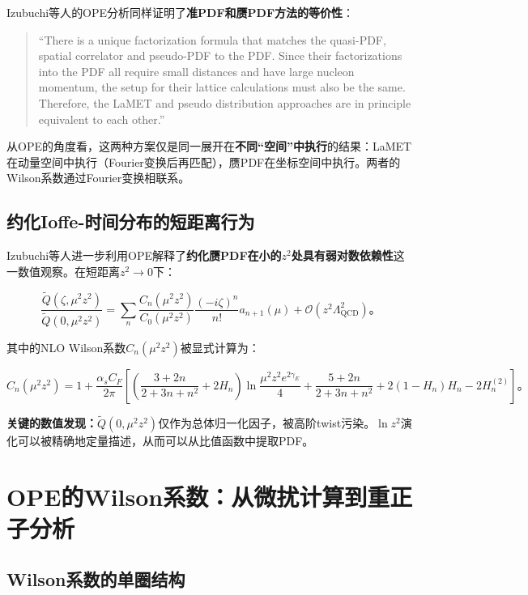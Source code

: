 \documentclass[12pt,a4paper]{ctexart}
\theoremstyle{definition}
\begin{document}
Izubuchi等人\cite{Izubuchi2018}的OPE分析同样证明了\textbf{准PDF和赝PDF方法的等价性}：

\begin{quote}
``There is a unique factorization formula that matches the quasi-PDF, spatial correlator and pseudo-PDF to the PDF. Since their factorizations into the PDF all require small distances and have large nucleon momentum, the setup for their lattice calculations must also be the same. Therefore, the LaMET and pseudo distribution approaches are in principle equivalent to each other.''
\end{quote}

从OPE的角度看，这两种方案仅是同一展开在\textbf{不同``空间''中执行}的结果：LaMET在动量空间中执行（Fourier变换后再匹配），赝PDF在坐标空间中执行。两者的Wilson系数通过Fourier变换相联系。

\subsection{约化Ioffe-时间分布的短距离行为}

Izubuchi等人\cite{Izubuchi2018}进一步利用OPE解释了\textbf{约化赝PDF在小的$z^2$处具有弱对数依赖性}这一数值观察。在短距离$z^2 \to 0$下：

\begin{equation}
\frac{\tilde{Q}(\zeta, \mu^2 z^2)}{\tilde{Q}(0, \mu^2 z^2)} = \sum_n \frac{C_n(\mu^2 z^2)}{C_0(\mu^2 z^2)} \frac{(-i\zeta)^n}{n!} a_{n+1}(\mu) + \mathcal{O}(z^2\Lambda_{\text{QCD}}^2)。
\label{eq:ratio_OPE}
\end{equation}

其中的NLO Wilson系数$C_n(\mu^2 z^2)$被显式计算为\cite{Izubuchi2018}：

\begin{equation}
C_n(\mu^2 z^2) = 1 + \frac{\alpha_s C_F}{2\pi}\left[ \left(\frac{3+2n}{2+3n+n^2} + 2H_n\right) \ln\frac{\mu^2 z^2 e^{2\gamma_E}}{4} + \frac{5+2n}{2+3n+n^2} + 2(1-H_n)H_n - 2H^{(2)}_n \right]。
\end{equation}

\textbf{关键的数值发现：}$\tilde{Q}(0, \mu^2 z^2)$仅作为总体归一化因子，被高阶twist污染。$\ln z^2$演化可以被精确地定量描述，从而可以从比值函数中提取PDF。

\section{OPE的Wilson系数：从微扰计算到重正子分析}

\subsection{Wilson系数的单圈结构}
\end{document}
